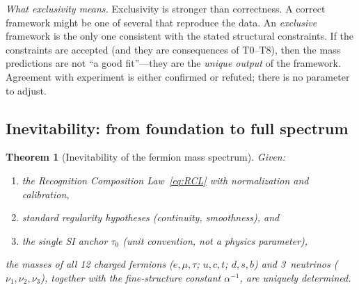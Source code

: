 \documentclass[11pt,a4paper]{article}
\newtheorem{theorem}{Theorem}[section]
\theoremstyle{definition}
\theoremstyle{remark}
\begin{document}
\noindent\textit{What exclusivity means.}\quad
Exclusivity is stronger than correctness.  A correct framework might be one
of several that reproduce the data.  An \emph{exclusive} framework is the
only one consistent with the stated structural constraints.  If the
constraints are accepted (and they are consequences of T0--T8), then the
mass predictions are not ``a good fit''---they are the \emph{unique output}
of the framework.  Agreement with experiment is either confirmed or refuted;
there is no parameter to adjust.

\subsection{Inevitability: from foundation to full spectrum}

\begin{theorem}[Inevitability of the fermion mass spectrum]
\label{thm:inevitability}
Given:
\begin{enumerate}[nosep,label=(\roman*)]
  \item the Recognition Composition Law~\eqref{eq:RCL} with normalization
        and calibration,
  \item standard regularity hypotheses (continuity, smoothness), and
  \item the single SI anchor $\tau_0$ (unit convention, not a physics
        parameter),
\end{enumerate}
the masses of all 12 charged fermions ($e, \mu, \tau$; $u, c, t$; $d, s, b$)
and 3~neutrinos ($\nu_1, \nu_2, \nu_3$), together with the fine-structure
constant $\alpha^{-1}$, are uniquely determined.
\end{theorem}
\end{document}
